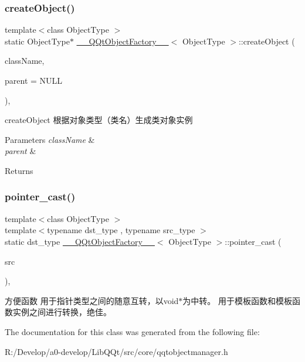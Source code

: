 \subsubsection{\texorpdfstring{create\+Object()}{createObject()}}
{\footnotesize\ttfamily template$<$class Object\+Type $>$ \\
static Object\+Type$\ast$ \mbox{\hyperlink{class_____q_qt_object_factory____}{\+\_\+\+\_\+\+Q\+Qt\+Object\+Factory\+\_\+\+\_\+}}$<$ Object\+Type $>$\+::create\+Object (\begin{DoxyParamCaption}\item[{const Q\+Byte\+Array \&}]{class\+Name,  }\item[{Object\+Type $\ast$}]{parent = {\ttfamily NULL} }\end{DoxyParamCaption})\hspace{0.3cm}{\ttfamily [inline]}, {\ttfamily [static]}}



create\+Object 根据对象类型（类名）生成类对象实例 


\begin{DoxyParams}{Parameters}
{\em class\+Name} & \\
\hline
{\em parent} & \\
\hline
\end{DoxyParams}
\begin{DoxyReturn}{Returns}

\end{DoxyReturn}
\mbox{\label{class_____q_qt_object_factory_____a25df0d6e1a24fd1a9c263768aad1e201}} 
\subsubsection{\texorpdfstring{pointer\+\_\+cast()}{pointer\_cast()}}
{\footnotesize\ttfamily template$<$class Object\+Type $>$ \\
template$<$typename dst\+\_\+type , typename src\+\_\+type $>$ \\
static dst\+\_\+type \mbox{\hyperlink{class_____q_qt_object_factory____}{\+\_\+\+\_\+\+Q\+Qt\+Object\+Factory\+\_\+\+\_\+}}$<$ Object\+Type $>$\+::pointer\+\_\+cast (\begin{DoxyParamCaption}\item[{src\+\_\+type}]{src }\end{DoxyParamCaption})\hspace{0.3cm}{\ttfamily [inline]}, {\ttfamily [static]}}

方便函数 用于指针类型之间的随意互转，以void$\ast$为中转。 用于模板函数和模板函数实例之间进行转换，绝佳。 

The documentation for this class was generated from the following file\+:\begin{DoxyCompactItemize}
\item 
R\+:/\+Develop/a0-\/develop/\+Lib\+Q\+Qt/src/core/qqtobjectmanager.\+h\end{DoxyCompactItemize}
